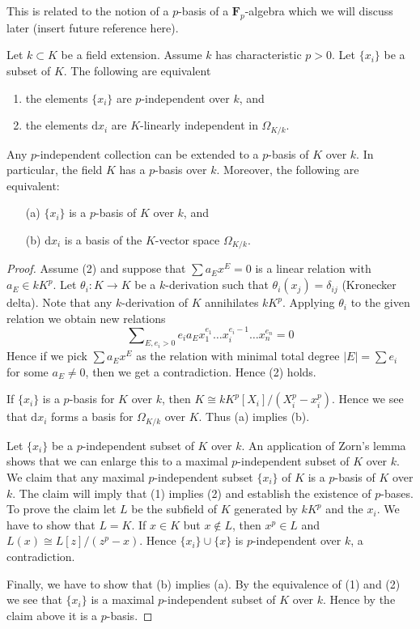 \noindent
This is related to the notion of a $p$-basis of a $\mathbf{F}_p$-algebra
which we will discuss later (insert future reference here).

\begin{lemma}
\label{lemma-p-basis}
Let $k \subset K$ be a field extension. Assume $k$ has characteristic
$p > 0$. Let $\{x_i\}$ be a subset of $K$. The following are equivalent
\begin{enumerate}
\item the elements $\{x_i\}$ are $p$-independent over $k$, and
\item the elements $\text{d}x_i$ are $K$-linearly independent
in $\Omega_{K/k}$.
\end{enumerate}
Any $p$-independent collection can be extended to a $p$-basis of $K$ over $k$.
In particular, the field $K$ has a $p$-basis over $k$.
Moreover, the following are equivalent:
\begin{enumerate}
\item[(a)] $\{x_i\}$ is a $p$-basis of $K$ over $k$, and
\item[(b)] $\text{d}x_i$ is a basis of the $K$-vector space $\Omega_{K/k}$.
\end{enumerate}
\end{lemma}

\begin{proof}
Assume (2) and suppose that $\sum a_E x^E = 0$ is a linear relation
with $a_E \in k K^p$. Let $\theta_i : K \to K$ be a $k$-derivation such that
$\theta_i(x_j) = \delta_{ij}$ (Kronecker delta). Note that any $k$-derivation
of $K$ annihilates $kK^p$. Applying $\theta_i$ to the given relation we
obtain new relations
$$
\sum\nolimits_{E, e_i > 0}
e_i a_E x_1^{e_1}\ldots x_i^{e_i - 1} \ldots x_n^{e_n} = 0
$$
Hence if we pick $\sum a_E x^E$ as the relation with minimal
total degree $|E| = \sum e_i$ for some $a_E \not = 0$, then we
get a contradiction. Hence (2) holds.

\medskip\noindent
If $\{x_i\}$ is a $p$-basis for $K$ over $k$, then
$K \cong kK^p[X_i]/(X_i^p - x_i^p)$. Hence we see that
$\text{d}x_i$ forms a basis for $\Omega_{K/k}$ over $K$.
Thus (a) implies (b).

\medskip\noindent
Let $\{x_i\}$ be a $p$-independent subset of $K$ over $k$. An application
of Zorn's lemma shows that we can enlarge this to a maximal $p$-independent
subset of $K$ over $k$. We claim that any maximal $p$-independent subset
$\{x_i\}$ of $K$ is a $p$-basis of $K$ over $k$. The claim will imply
that (1) implies (2) and establish the existence of $p$-bases.
To prove the claim let $L$ be the subfield of $K$ generated by
$kK^p$ and the $x_i$. We have to show that $L = K$. If $x \in K$
but $x \not \in L$, then $x^p \in L$ and $L(x) \cong L[z]/(z^p - x)$.
Hence $\{x_i\} \cup \{x\}$ is $p$-independent over $k$, a contradiction.

\medskip\noindent
Finally, we have to show that (b) implies (a). By the equivalence of (1)
and (2) we see that $\{x_i\}$ is a maximal $p$-independent subset
of $K$ over $k$. Hence by the claim above it is a $p$-basis.
\end{proof}

